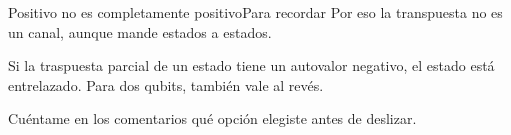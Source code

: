 \documentclass[12pt]{beamer}
\begin{document}
\begin{frame}{Positivo no es completamente positivo}{Para recordar}
Por eso la transpuesta no es un canal, aunque mande estados a estados.
\begin{thmbox}
Si la traspuesta parcial de un estado tiene un autovalor negativo, el
estado está entrelazado. Para dos qubits, también vale al revés.
\end{thmbox}
\end{frame}

  {Cuéntame en los comentarios qué opción elegiste antes de deslizar.}
\end{document}
